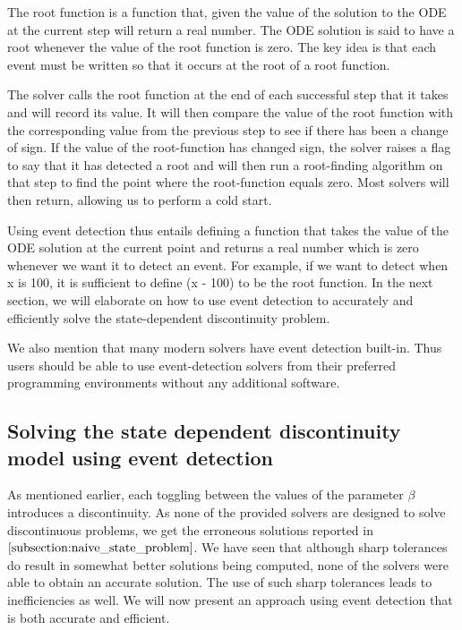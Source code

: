 The root function is a function that, given the value of the solution to the ODE at the current step will return a real number. The ODE solution is said to have a root whenever the value of the root function is zero. The key idea is that each event must be written so that it occurs at the root of a root function.

The solver calls the root function at the end of each successful step that it takes and will record its value. It will then compare the value of the root function with the corresponding value from the previous step to see if there has been a change of sign. If the value of the root-function has changed sign, the solver raises a flag to say that it has detected a root and will then run a root-finding algorithm on that step to find the point where the root-function equals zero. Most solvers will then return, allowing us to perform a cold start.

Using event detection thus entails defining a function that takes the value of the ODE solution at the current point and returns a real number which is zero whenever we want it to detect an event. For example, if we want to detect when x is 100, it is sufficient to define (x - 100) to be the root function. In the next section, we will elaborate on how to use event detection to accurately and efficiently solve the state-dependent discontinuity problem.

We also mention that many modern solvers have event detection built-in. Thus users should be able to use event-detection solvers from their preferred programming environments without any additional software.

\subsection{Solving the state dependent discontinuity model using event detection}
\label{subsection:state_with_event_detection}
As mentioned earlier, each toggling between the values of the parameter $\beta$ introduces a discontinuity. As none of the provided solvers are designed to solve discontinuous problems, we get the erroneous solutions reported in $\ref{subsection:naive_state_problem}$. We have seen that although sharp tolerances do result in somewhat better solutions being computed, none of the solvers were able to obtain an accurate solution. The use of such sharp tolerances leads to inefficiencies as well. We will now present an approach using event detection that is both accurate and efficient.

